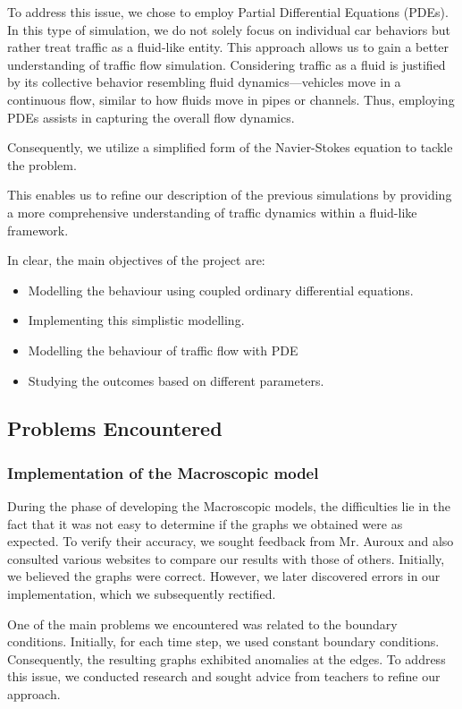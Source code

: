 \documentclass{article}
\begin{document}
	To address this issue, we chose to employ Partial Differential Equations (PDEs). In this type of simulation, we do not solely focus on individual car behaviors but rather treat traffic as a fluid-like entity. This approach allows us to gain a better understanding of traffic flow simulation. Considering traffic as a fluid is justified by its collective behavior resembling fluid dynamics—vehicles move in a continuous flow, similar to how fluids move in pipes or channels. Thus, employing PDEs assists in capturing the overall flow dynamics.
	
	Consequently, we utilize a simplified form of the Navier-Stokes equation to tackle the problem.
	
	This enables us to refine our description of the previous simulations by providing a more comprehensive understanding of traffic dynamics within a fluid-like framework. \newline\newline
	
	In clear, the main objectives of the project are: 
	\begin{itemize}
		\item Modelling the behaviour using coupled ordinary differential equations.
		\item Implementing this simplistic modelling.
		\item Modelling the behaviour of traffic flow with PDE
		\item Studying the outcomes based on different parameters.
	\end{itemize}
	
	\subsection{Problems Encountered}
	\subsubsection{Implementation of the Macroscopic model}
		During the phase of developing the Macroscopic models, the difficulties lie in the fact that it was not easy to determine if the graphs we obtained were as expected. To verify their accuracy, we sought feedback from Mr. Auroux and also consulted various websites to compare our results with those of others. Initially, we believed the graphs were correct. However, we later discovered errors in our implementation, which we subsequently rectified.
		
		One of the main problems we encountered was related to the boundary conditions. Initially, for each time step, we used constant boundary conditions. Consequently, the resulting graphs exhibited anomalies at the edges. To address this issue, we conducted research and sought advice from teachers to refine our approach.
		
\end{document}
